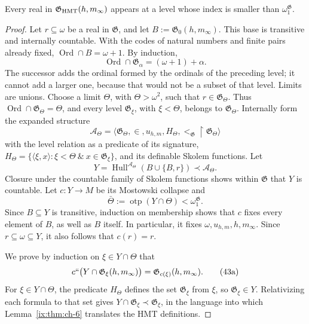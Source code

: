 \begin{lemma}
\label{ix:thm:ch-8}
Every real in \(\mathfrak G_{\rm HMT}(h,m_\infty)\) appears at a level whose
index is smaller than \(\omega_1^{\mathfrak G}\).

\end{lemma}
\begin{proof}
Let \(r\subseteq\omega\) be a real in \(\mathfrak G\), and let
\(B:=\mathfrak G_0(h,m_\infty)\). This base is transitive and internally
countable. With the codes of natural numbers and finite pairs already fixed,
\(\operatorname{Ord}\cap B=\omega+1\). By induction,
\[
 \operatorname{Ord}\cap\mathfrak G_\alpha=(\omega+1)+\alpha.
\]
The successor adds the ordinal formed by the ordinals of the preceding level;
it cannot add a larger one, because that would not be a subset of that level.
Limits are unions. Choose a limit \(\Theta\), with \(\Theta>\omega^2\), such
that \(r\in\mathfrak G_\Theta\). Thus
\(\operatorname{Ord}\cap\mathfrak G_\Theta=\Theta\), and every level
\(\mathfrak G_\xi\), with \(\xi<\Theta\), belongs to
\(\mathfrak G_\Theta\). Internally form the expanded structure
\[
 \mathcal A_\Theta=
 \langle\mathfrak G_\Theta,\in,u_{h,m},
         H_\Theta,<_{\mathfrak G}\!\upharpoonright\mathfrak G_\Theta\rangle
\]
with the level relation as a predicate of its signature,
\(H_\Theta=\{\langle\xi,x\rangle:\xi<\Theta\ \&\
x\in\mathfrak G_\xi\}\), and its definable Skolem functions. Let
\[
 Y=\operatorname{Hull}^{\mathcal A_\Theta}
   (B\cup\{B,r\})\prec\mathcal A_\Theta .
\]
Closure under the countable family of Skolem functions shows within
\(\mathfrak G\) that \(Y\) is countable. Let
\(c:Y\rightarrow M\) be its Mostowski collapse and
\[
 \bar\Theta:=\operatorname{otp}(Y\cap\Theta)
 <\omega_1^{\mathfrak G}.
\]
Since \(B\subseteq Y\) is transitive, induction on membership shows that
\(c\) fixes every element of \(B\), as well as \(B\) itself. In particular,
it fixes \(\omega,u_{h,m},h,m_\infty\). Since
\(r\subseteq\omega\subseteq Y\), it also follows that \(c(r)=r\).

We prove by induction on \(\xi\in Y\cap\Theta\) that
\[
 c``\bigl(Y\cap\mathfrak G_\xi(h,m_\infty)\bigr)
 =\mathfrak G_{c(\xi)}(h,m_\infty).
\tag{43a}\label{ix:eq:ch-condensacion}
\]
For \(\xi\in Y\cap\Theta\), the predicate \(H_\Theta\) defines the set
\(\mathfrak G_\xi\) from \(\xi\), so \(\mathfrak G_\xi\in Y\).
Relativizing each formula to that set gives
\(Y\cap\mathfrak G_\xi\prec\mathfrak G_\xi\), in the language into which
Lemma~\ref{ix:thm:ch-6} translates the HMT definitions.


\end{proof}
